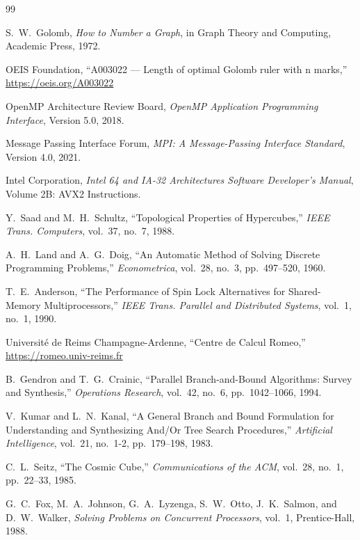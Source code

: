\documentclass[12pt,a4paper,twoside]{report}
\begin{document}
\begin{thebibliography}{99}


S.~W.~Golomb, \emph{How to Number a Graph}, in Graph Theory and Computing, Academic Press, 1972.

OEIS Foundation, ``A003022 --- Length of optimal Golomb ruler with n marks,'' \url{https://oeis.org/A003022}

OpenMP Architecture Review Board, \emph{OpenMP Application Programming Interface}, Version 5.0, 2018.

Message Passing Interface Forum, \emph{MPI: A Message-Passing Interface Standard}, Version 4.0, 2021.

Intel Corporation, \emph{Intel 64 and IA-32 Architectures Software Developer's Manual}, Volume 2B: AVX2 Instructions.

Y.~Saad and M.~H.~Schultz, ``Topological Properties of Hypercubes,'' \emph{IEEE Trans. Computers}, vol.~37, no.~7, 1988.

A.~H.~Land and A.~G.~Doig, ``An Automatic Method of Solving Discrete Programming Problems,'' \emph{Econometrica}, vol.~28, no.~3, pp.~497--520, 1960.

T.~E.~Anderson, ``The Performance of Spin Lock Alternatives for Shared-Memory Multiprocessors,'' \emph{IEEE Trans. Parallel and Distributed Systems}, vol.~1, no.~1, 1990.

Université de Reims Champagne-Ardenne, ``Centre de Calcul Romeo,'' \url{https://romeo.univ-reims.fr}


B.~Gendron and T.~G.~Crainic, ``Parallel Branch-and-Bound Algorithms: Survey and Synthesis,'' \emph{Operations Research}, vol.~42, no.~6, pp.~1042--1066, 1994.

V.~Kumar and L.~N.~Kanal, ``A General Branch and Bound Formulation for Understanding and Synthesizing And/Or Tree Search Procedures,'' \emph{Artificial Intelligence}, vol.~21, no.~1-2, pp.~179--198, 1983.

C.~L.~Seitz, ``The Cosmic Cube,'' \emph{Communications of the ACM}, vol.~28, no.~1, pp.~22--33, 1985.

G.~C.~Fox, M.~A.~Johnson, G.~A.~Lyzenga, S.~W.~Otto, J.~K.~Salmon, and D.~W.~Walker, \emph{Solving Problems on Concurrent Processors}, vol.~1, Prentice-Hall, 1988.


\end{thebibliography}
\end{document}

